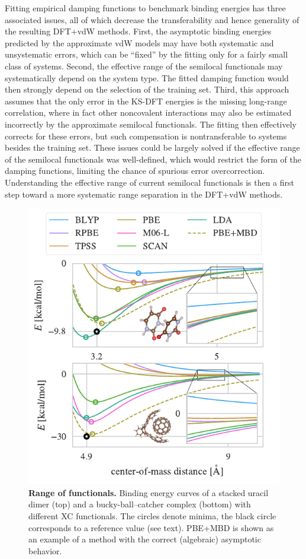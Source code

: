 Fitting empirical damping functions to benchmark binding energies has three associated issues, all of which decrease the transferability and hence generality of the resulting DFT+vdW methods.
First, the asymptotic binding energies predicted by the approximate vdW models may have both systematic and unsystematic errors, which can be ``fixed'' by the fitting only for a fairly small class of systems.
Second, the effective range of the semilocal functionals may systematically depend on the system type.
The fitted damping function would then strongly depend on the selection of the training set.
Third, this approach assumes that the only error in the KS-DFT energies is the missing long-range correlation, where in fact other noncovalent interactions may also be estimated incorrectly by the approximate semilocal functionals.
The fitting then effectively corrects for these errors, but such compensation is nontransferable to systems besides the training set.
These issues could be largely solved if the effective range of the semilocal functionals was well-defined, which would restrict the form of the damping functions, limiting the chance of spurious error overcorrection.
Understanding the effective range of current semilocal functionals is then a first step toward a more systematic range separation in the DFT+vdW methods.

\begin{figure}[t!]
\includegraphics[center]{media/range-curves}
\caption{\textbf{Range of functionals.}
Binding energy curves of a stacked uracil dimer (top) and a bucky-ball--catcher complex (bottom) with different XC functionals.
The circles denote minima, the black circle corresponds to a reference value (see text).
PBE+MBD is shown as an example of a method with the correct (algebraic) asymptotic behavior.
}\label{fig:range}
\end{figure}

